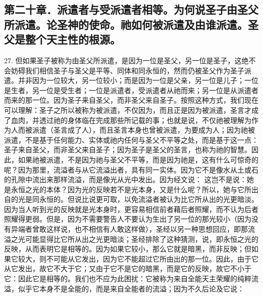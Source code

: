 
\subsection{第二十章．派遣者与受派遣者相等。为何说圣子由圣父所派遣。论圣神的使命。祂如何被派遣及由谁派遣。圣父是整个天主性的根源。}

27. 但如果圣子被称为由圣父所派遣，是因为一位是圣父，另一位是圣子，这绝不会妨碍我们相信圣子与圣父是平等、同体和同永恒的，然而仍被圣父作为圣子派遣。并非因为一位较大，另一位较小；而是因为一位是父亲，另一位是儿子；一位是生者，另一位是受生者；一位是派遣者，受派遣者从祂而来；另一位是从派遣者而来的那一位。因为圣子来自圣父，而非圣父来自圣子。按照这种方式，我们现在可以理解：圣子之所以被称为被派遣，不仅因为，而且正是因为被派遣，圣言才成了血肉，并透过祂的身体临在完成那些所记载的事；也就是说，不仅祂被理解为作为人而被派遣（圣言成了人），而且圣言本身也曾被派遣，为要成为人；因为祂被派遣，不是基于任何能力、实体或祂内任何与圣父不平等之处，而是基于这一点：圣子来自圣父，而非圣父来自圣子；因为圣子是圣父的圣言，也称为祂的智慧。因此，如果祂被派遣，不是因为祂与圣父不平等，而是因为祂是，这有什么可惊奇的呢？因为那里，流溢者与从它流溢出者，具有同一实体。因为它不是像水从土或石的孔隙中流出来那样流溢，而是像光从光中发出。因为经文说： 这岂不是说：她是永恒之光的本体？因为光的反映若不是光本身，又是什么呢？所以，她与它所出自的光是同永恒的。但说比说更可取，以免流溢者被认为比它所从出的光更暗淡。因为当人听到光的反映就是光本身时，更容易相信前者藉后者照耀，而不认为后者照耀得更弱。但是，因为不需要警告人不要认为生出了另一位的那光较小（因为没有异端者曾敢这样说，也不相信有人敢这样做），圣经以另一种思想回应，即那流溢之光可能显得比它所从出之光更暗淡；圣经排除了这种猜测，说，即永恒之光的反映，从而表明它是相等的。因为如果它较小，那么它就是暗黑，而非反映；但如果它较大，则不可能从它发出，因为它不能超过它所由出的那一位。因此，由于它从它发出，故它不大于它；又由于它不是它的暗黑，而是它的反映，故它不小于它：因此它是相等的。我们也不应为此困扰：它被称为来自全能天主荣耀的纯粹流溢，似乎它本身不是全能的，而是来自全能者的流溢；因为不久后论及它说： 